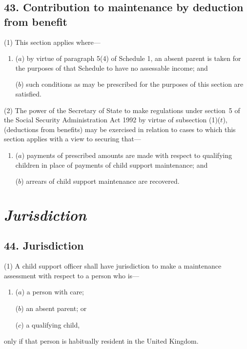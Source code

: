 \documentclass[12pt,a4paper]{article}
\begin{document}

\subsection{43. Contribution to maintenance by deduction from benefit}

(1) This section applies where—
\begin{enumerate}\item[]
($a$) by virtue of paragraph 5(4)  of Schedule 1, an absent parent is taken for the purposes of that Schedule to have no assessable income; and

($b$) such conditions as may be prescribed for the purposes of this section are satisfied.
\end{enumerate}

(2) The power of the Secretary of State to make regulations under 
section~5 of the Social Security Administration Act 1992 by virtue of subsection (1)($t$),  %
(deductions from benefits) may be exercised in relation to cases to which this section applies with a view to securing that—
\begin{enumerate}\item[]
($a$) payments of prescribed amounts are made with respect to qualifying children in place of payments of child support maintenance; and

($b$) arrears of child support maintenance are recovered.
\end{enumerate}


\section{\itshape Jurisdiction}

\subsection{44. Jurisdiction}

(1) A child support officer shall have jurisdiction to make a maintenance assessment with respect to a person who is—
\begin{enumerate}\item[]
($a$) a person with care;

($b$) an absent parent; or

($c$) a qualifying child,
\end{enumerate}
only if that person is habitually resident in the United Kingdom.
\end{document}
